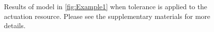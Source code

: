 \begin{figure}[h]

  \caption{Results of model in \cref{fig:Example1} when tolerance is applied
  to the actuation  resource. Please see the supplementary
  materials for more details.}
\end{figure}

